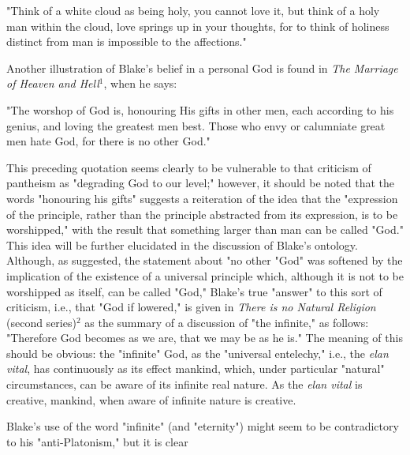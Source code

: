 \begin{center}
	\parbox{0.8\textwidth}{
		\hspace*{5mm}"Think of a white cloud as being holy, you cannot love it, but
		think of a holy man within the cloud, love springs up in your thoughts, for to
		think of holiness distinct from man is impossible to the affections."\par
	}%
\end{center}
\hspace*{5mm}Another illustration of Blake's belief in a personal God is found in \textit{The Marriage of Heaven and Hell}$^{1}$, when he says:\par
\begin{center}
	\parbox{0.8\textwidth}{
		\hspace*{5mm}"The worshop of God is, honouring His gifts in other men, each according to
		his genius, and loving the greatest men best. Those who envy or calumniate great men hate
		God, for there is no other God."\par
	}%
\end{center}
\hspace*{5mm}This preceding quotation seems clearly to be vulnerable to that criticism of pantheism as "degrading
God to our level;" however, it should be noted that the words "honouring his
gifts" suggests a reiteration of the idea that the "expression of the principle, rather than
the principle abstracted from its expression, is to be worshipped," with the result that
something larger than man can be called "God." This idea will be further elucidated in the discussion
of Blake's ontology. Although, as suggested, the statement about "no other "God" was softened by the implication
of the existence of a universal principle which, although it is not to be worshipped as itself, can be called "God," Blake's
true "answer" to this sort of criticism, i.e., that "God if lowered," is given in \textit{There is no Natural Religion} (second series)$^{2}$
as the summary of a discussion of "the infinite," as follows: "Therefore God becomes as we are, that we may be as he is." The meaning of this
should be obvious: the "infinite" God, as the "universal entelechy," i.e., the \textit{elan vital}, has continuously
as its effect mankind, which, under particular "natural" circumstances, can be aware of its infinite real nature. As the \textit{elan vital}
is creative, mankind, when aware of infinite nature is creative.\par
\vspace*{0.5\baselineskip}
Blake's use of the word "infinite" (and "eternity") might seem to be contradictory to his "anti-Platonism," but it is clear

